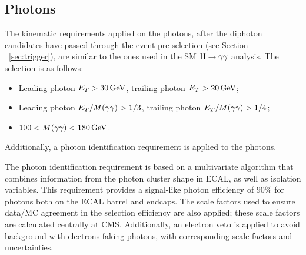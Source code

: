 \subsection{Photons}
\label{sec:photons}

The kinematic requirements applied on the photons, after the diphoton candidates have passed through the event pre-selection (see Section ~\ref{sec:trigger}), are similar to the ones used in the SM $\mathrm{H}\to\gamma\gamma$ analysis. The selection is as follows:
\begin{itemize}
\item Leading photon $E_{T} > 30 \,\text{Ge\hspace{-.08em}V}$, trailing photon $E_{T}>20 \,\text{Ge\hspace{-.08em}V}$;
\item Leading photon $E_{T}/M(\gamma\gamma) > 1/3$, trailing photon $E_{T}/M(\gamma\gamma) > 1/4$;
\item $100 < M(\gamma\gamma) < 180 \,\text{Ge\hspace{-.08em}V}$.
\end{itemize}
Additionally, a photon identification requirement is applied to the photons.

The photon identification requirement is based on a multivariate algorithm that combines information from the photon cluster shape in ECAL, as well as isolation variables. 
This requirement provides a signal-like photon efficiency of $90\%$ for photons both on the ECAL barrel and endcaps. 
The scale factors used to ensure data/MC agreement in the selection efficiency are also applied; these scale factors are calculated centrally at CMS. 
Additionally, an electron veto is applied to avoid background with electrons faking photons, with corresponding scale factors and uncertainties.






